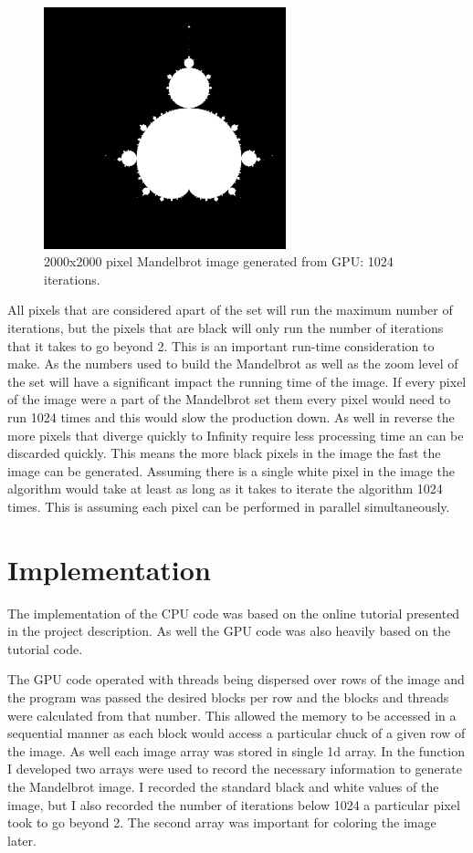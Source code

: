 \documentclass[letterpaper,twocolumn, 11pt]{article}
\begin{document}
\begin{figure}
  \centering
  \includegraphics[width=7cm]{mandelbrot.png}
  \caption{2000x2000 pixel Mandelbrot image generated from GPU: 1024 iterations.}
  \label{fig:mandelbrot}
\end{figure}
All pixels that are considered apart of the set will run the maximum number of iterations, but the pixels that are black will only run the number of iterations that it takes to go beyond 2. This is an important run-time consideration to make. As the numbers used to build the Mandelbrot as well as the zoom level of the set will have a significant impact the running time of the image. If every pixel of the image were a part of the Mandelbrot set them every pixel would need to run 1024 times and this would slow the production down. As well in reverse the more pixels that diverge quickly to Infinity require less processing time an can be discarded quickly. This means the more black pixels in the image the fast the image can be generated. Assuming there is a single white pixel in the image the algorithm would take at least as long as it takes to iterate the algorithm 1024 times. This is assuming each pixel can be performed in parallel simultaneously.

\section{Implementation}
The implementation of the CPU code was based on the online tutorial presented in the project description. As well the GPU code was also heavily based on the tutorial code.

The GPU code operated with threads being dispersed over rows of the image and the program was passed the desired blocks per row and the blocks and threads were calculated from that number. This allowed the memory to be accessed in a sequential manner as each block would access a particular chuck of a given row of the image. As well each image array was stored in single 1d array. In the function I developed two arrays were used to record the necessary information to generate the Mandelbrot image. I recorded the standard black and white values of the image, but I also recorded the number of iterations below 1024 a particular pixel took to go beyond 2. The second array was important for coloring the image later.
\end{document}
